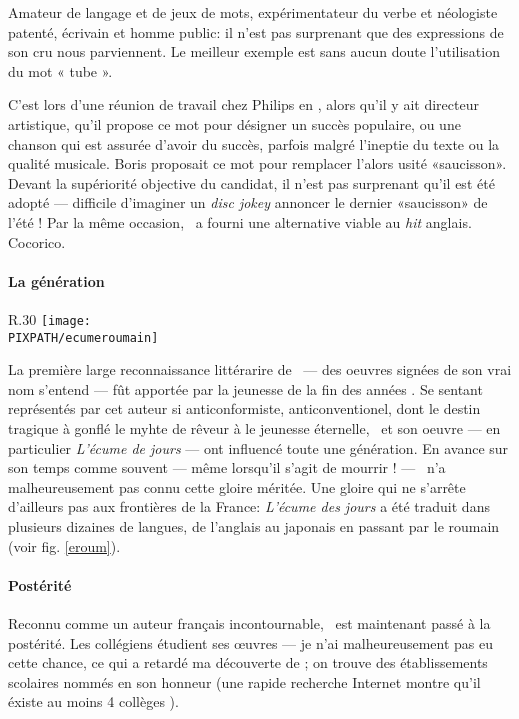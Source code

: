 Amateur de langage et de jeux de mots, expérimentateur du verbe et néologiste
patenté, écrivain et homme public: il n'est pas surprenant que des expressions
de son cru nous parviennent.
Le meilleur exemple est sans aucun doute l'utilisation du mot « tube ».

C'est lors d'une réunion de travail chez Philips en , alors qu'il y ait
directeur artistique, qu'il propose ce mot pour désigner un succès populaire,
ou une chanson qui est assurée d'avoir du succès, parfois malgré l'ineptie du
texte ou la qualité musicale. Boris proposait ce mot pour remplacer l'alors
usité «saucisson». Devant la supériorité objective du candidat, il n'est pas
surprenant qu'il est été adopté --- difficile d'imaginer un \emph{disc jokey}
annoncer le dernier «saucisson» de l'été ! Par la même occasion, \BV\ a
fourni une alternative viable au \emph{hit} anglais. Cocorico.

\paragraph{La génération }

\begin{wrapfigure}{R}{.30\textwidth}
\centering
\texttt{[image: \\PIXPATH/ecumeroumain]}
\caption{Édition roumaine de \emph{L'écume des jours}. Traduction de Sorin Mărculescu}
\label{eroum}
\end{wrapfigure}
La première large reconnaissance littérarire de \BV\ --- des oeuvres signées
de son vrai nom s'entend --- fût apportée par la jeunesse de la fin des années .
Se sentant représentés par cet auteur si anticonformiste, anticonventionel, dont
le destin tragique à gonflé le myhte de rêveur à le jeunesse éternelle, \BV\ 
et son oeuvre --- en particulier \emph{L'écume de jours} --- ont influencé toute une
génération. En avance sur son temps comme souvent --- même lorsqu'il s'agit de
mourrir ! --- \BV\ n'a malheureusement pas connu cette gloire méritée.
Une gloire qui ne s'arrête d'ailleurs pas aux frontières de la France: \emph{L'écume
des jours} a été traduit dans plusieurs dizaines de langues, de l'anglais au japonais en passant
par le roumain (voir fig. \ref{eroum}).

\paragraph{Postérité}
Reconnu comme un auteur français incontournable, \BV\ est maintenant passé à la postérité.
Les collégiens étudient ses \oe{}uvres --- je n'ai malheureusement pas eu cette chance,
ce qui a retardé ma découverte de \BV; on trouve des établissements scolaires nommés en
son honneur (une rapide recherche Internet montre qu'il éxiste au moins 4 collèges \BV).

